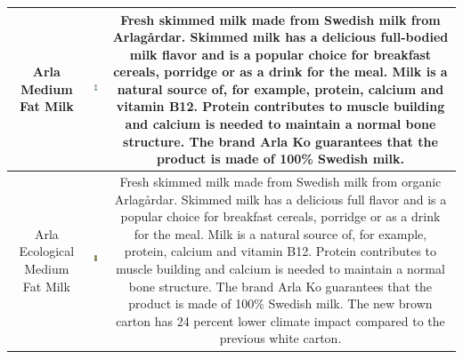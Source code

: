 \begin{table}[!ht]
{\begin{tabular}{c c c}
         \toprule
         \multicolumn{1}{p{1.5cm}}{\vspace{-17mm} {\footnotesize Arla Medium Fat Milk} } &
         \includegraphics[width=21mm, height=21mm]{PaperB/appendix/figures/iconic_images/Arla-Milk-Medium-Fat_Clean.jpg} & 
         \multicolumn{1}{p{12cm}}{\vspace{-21mm} {\footnotesize Fresh skimmed milk made from Swedish milk from Arlagårdar. Skimmed milk has a delicious full-bodied milk flavor and is a popular choice for breakfast cereals, porridge or as a drink for the meal. Milk is a natural source of, for example, protein, calcium and vitamin B12. Protein contributes to muscle building and calcium is needed to maintain a normal bone structure. The brand Arla Ko guarantees that the product is made of 100\% Swedish milk.} } \\
         
         \toprule 
         \multicolumn{1}{p{1.5cm}}{\vspace{-18mm} {\footnotesize Arla Ecological Medium Fat Milk} } &
         \includegraphics[width=21mm, height=21mm]{PaperB/appendix/figures/iconic_images/Arla-Ecological-Medium-Fat-Milk_Iconic.jpg} & 
         \multicolumn{1}{p{12cm}}{\vspace{-22mm} {\footnotesize Fresh skimmed milk made from Swedish milk from organic Arlagårdar. Skimmed milk has a delicious full flavor and is a popular choice for breakfast cereals, porridge or as a drink for the meal. Milk is a natural source of, for example, protein, calcium and vitamin B12. Protein contributes to muscle building and calcium is needed to maintain a normal bone structure. The brand Arla Ko guarantees that the product is made of 100\% Swedish milk. The new brown carton has 24 percent lower climate impact compared to the previous white carton.} } \\
         

\end{tabular}}
\end{table}
